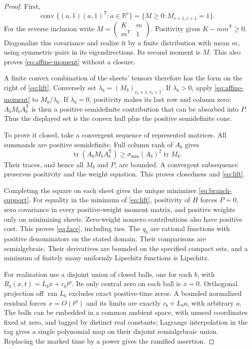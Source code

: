 \documentclass[11pt,reqno]{amsart}
\numberwithin{equation}{section}
\theoremstyle{definition}
\theoremstyle{remark}
\newcommand{\R}{\mathbb R}
\newcommand{\tr}{\operatorname{tr}}
\newcommand{\ran}{\operatorname{ran}}
\begin{document}
\begin{proof}
First,
\begin{equation}\label{eq:affine-moment}
 \operatorname{conv}\{(a,1)(a,1)^{\mathsf T}:a\in\R^r\}
 =\{M\ge0:M_{r+1,r+1}=1\}.
\end{equation}
For the reverse inclusion write $M=\left(\begin{smallmatrix}K&m\\m^{\mathsf T}&1\end{smallmatrix}\right)$. Positivity gives $K-mm^{\mathsf T}\ge0$. Diagonalize this covariance and realize it by a finite distribution with mean $m$, using symmetric pairs in its eigendirections. Its second moment is $M$. This also proves \eqref{eq:affine-moment} without a closure.

A finite convex combination of the sheets' tensors therefore has the form on the right of \eqref{eq:lift}. Conversely set $\lambda_b=(M_b)_{r_b+1,r_b+1}$. If $\lambda_b>0$, apply \eqref{eq:affine-moment} to $M_b/\lambda_b$. If $\lambda_b=0$, positivity makes its last row and column zero; $A_bM_bA_b^{\mathsf T}$ is then a positive semidefinite contribution that can be absorbed into $P$. Thus the displayed set is the convex hull plus the positive semidefinite cone.

To prove it closed, take a convergent sequence of represented matrices. All summands are positive semidefinite. Full column rank of $A_b$ gives
\[
 \tr(A_bM_bA_b^{\mathsf T})\ge\sigma_{\min}(A_b)^2\tr M_b.
\]
Their traces, and hence all $M_b$ and $P$, are bounded. A convergent subsequence preserves positivity and the weight equation. This proves closedness and \eqref{eq:lift}.

Completing the square on each sheet gives the unique minimizer \eqref{eq:branch-support}. For equality in the minimum of \eqref{eq:lift}, positivity of $H$ forces $P=0$, zero covariance in every positive-weight moment matrix, and positive weights only on minimizing sheets. Zero-weight nonzero contributions also have positive cost. This proves \eqref{eq:face}, including ties. The $q_b$ are rational functions with positive denominators on the stated domain. Their comparisons are semialgebraic. Their derivatives are bounded on the specified compact sets, and a minimum of finitely many uniformly Lipschitz functions is Lipschitz.

For realization use a disjoint union of closed balls, one for each $b$, with
$R_b(x,t)=L_bx+c_bt^p$. Its only central zero on each ball is $x=0$. Orthogonal projection off $\ran L_b$ excludes exact positive-time zeros. A bounded normalized residual forces $x=O(t^p)$ and its limits are exactly $c_b+L_ba$, with arbitrary $a$. The balls can be embedded in a common ambient space, with unused coordinates fixed at zero, and tagged by distinct real constants; Lagrange interpolation in the tag gives a single polynomial map on their disjoint semialgebraic union. Replacing the marked time by a power gives the ramified assertion.
\end{proof}
\end{document}
